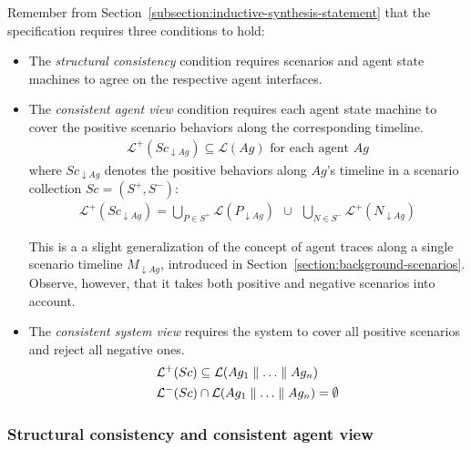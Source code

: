 Remember from Section~\ref{subsection:inductive-synthesis-statement} that the specification requires three conditions to hold: 
\begin{itemize}
\item The \emph{structural consistency} condition requires scenarios and agent state machines to agree on the respective agent interfaces.
\item The \emph{consistent agent view} condition requires each agent state machine to cover the positive scenario behaviors along the corresponding timeline.
\begin{align}
\mathcal{L}^+(Sc_{\downarrow Ag}) \subseteq \mathcal{L}(Ag)\mbox{~for each agent $Ag$}\label{proof:consistent-agent-view}
\end{align}
where $Sc_{\downarrow Ag}$ denotes the positive behaviors along $Ag$'s timeline in a scenario collection $Sc = (S^+, S^-)$:
\begin{align}
\mathcal{L}^+(Sc_{\downarrow Ag}) = \bigcup_{P \in S^+} \mathcal{L}(P_{\downarrow Ag})~~\cup~~\bigcup_{N \in S^{-}} \mathcal{L}^{+}(N_{\downarrow Ag})\label{proof:lemma-sc-projection}
\end{align}

This is a a slight generalization of the concept of agent traces along a single scenario timeline $M_{\downarrow Ag}$, introduced in Section~\ref{section:background-scenarios}. Observe, however, that it takes both positive and negative scenarios into account.
\item The \emph{consistent system view} requires the system to cover all positive scenarios and reject all negative ones. 
\begin{align}
&\mathcal{L}^+(Sc) \subseteq \mathcal{L}(Ag_1 \parallel \ldots \parallel Ag_n)\label{proof:consistent-system-view-1}\\
&\mathcal{L}^-(Sc) \cap      \mathcal{L}(Ag_1 \parallel \ldots \parallel Ag_n) = \emptyset\label{proof:consistent-system-view-2}
\end{align}
\end{itemize}

\subsubsection*{Structural consistency and consistent agent view}

